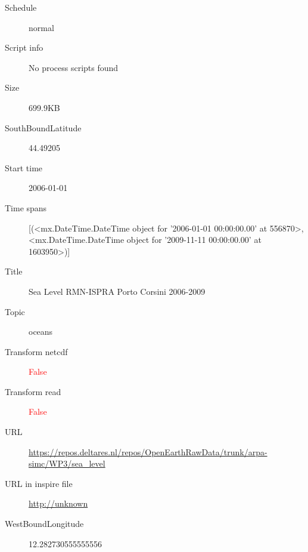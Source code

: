 \documentclass[9]{report}
\begin{document}
\begin{description}
\begin{verbatim}
\end{verbatim}
  \item[Schedule] normal
  \item[Script info] No process scripts found
  \item[Size] 699.9KB
  \item[SouthBoundLatitude] 44.49205
  \item[Start time] 2006-01-01
  \item[Time spans] [(<mx.DateTime.DateTime object for '2006-01-01 00:00:00.00' at 556870>, <mx.DateTime.DateTime object for '2009-11-11 00:00:00.00' at 1603950>)]
  \item[Title]  Sea Level RMN-ISPRA Porto Corsini 2006-2009 
  \item[Topic] oceans
  \item[Transform netcdf] \textcolor{red}{False}
  \item[Transform read] \textcolor{red}{False}
  \item[URL] \href{https://repos.deltares.nl/repos/OpenEarthRawData/trunk/arpa-simc/WP3/sea\_level}{https://repos.deltares.nl/repos/OpenEarthRawData/trunk/arpa-simc/WP3/sea\_level}
  \item[URL in inspire file] \href{http://unknown}{http://unknown}
  \item[WestBoundLongitude] 12.282730555555556
\end{description}
\end{document}
